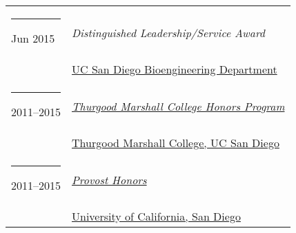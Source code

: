 \documentclass[margin,line]{res}
\begin{document}
\begin{resume}
\begin{longtable}{@{}p{0.7in}p{4in}}
\hspace*{-4mm} \rule{-1mm}{5mm} Jun 2015 & \textit{Distinguished Leadership/Service Award}\\*
\hspace*{-4mm} \hspace*{-4mm} & \hspace{4mm} \href{http://bioengineering.ucsd.edu/}{UC San Diego Bioengineering Department}\\
\hspace*{-4mm} \rule{-1mm}{5mm} 2011--2015 & \href{http://marshall.ucsd.edu/academics/tmc-honors-program.html}{\textit{Thurgood Marshall College Honors Program}}\\*
\hspace*{-4mm} \hspace*{-4mm} & \hspace{4mm} \href{https://marshall.ucsd.edu/}{Thurgood Marshall College, UC San Diego}\\
\hspace*{-4mm} \rule{-1mm}{5mm} 2011--2015 & \href{https://revelle.ucsd.edu/academics/honors-opportunities/honors-programs.html#Provost-Honors}{\textit{Provost Honors}}\\*
\hspace*{-4mm} \hspace*{-4mm} & \hspace{4mm} \href{http://ucsd.edu/}{University of California, San Diego}\\
\end{longtable}


\end{resume}
\end{document}

